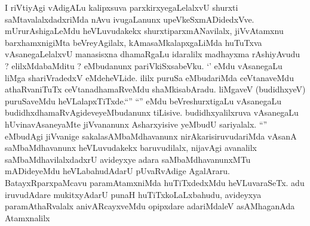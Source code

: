 \begin{artha}
I riVtiyAgi vAdigALu kalipxsuva parxkirxyegaLelalxvU shurxti
saMtavalalxdadxriMda nAvu ivugaLanunx
upeVkeSxmADidedxVve. mUrurAshigaLeMdu heVLuvudakekx
shurxtiparxmANavilalx, jiVvAtamxnu barxhamxnigiMta beVreyAgilalx,
kAmasaMkalapxgaLiMda huTuTxva vAsanegaLelalxvU manasisxna dhamaRgaLu
idaralilx madhayxma rAshiyAvudu ? elilxMdabaMditu ? eMbudanunx
pariVkiSxsabeVku. `\stext' eMdu vAsanegaLu liMga shariVradedxV
eMdeheVLide. ililx puruSa eMbudariMda ceVtanaveMdu athaRvaniTuTx
ceVtanadhamaRveMdu shaMkisabAradu. liMgaveV (budidhxyeV) puruSaveMdu
heVLalapxTiTxde.``\stext'' ``\stext'' eMdu  beVreshurxtigaLu
vAsanegaLu budidhxdhamaRvAgideveyeMbudanunx
tiLisive. budidhxyalilxruva vAsanegaLu hUvinavAsaneyaMte jiVvananunx
Asharxyisive yeMbudU sariyalalx. ``\stext'' eMbudAgi jiVvanige
sakalasAMbaMdhavanunx nirAkarisiruvudariMda vAsanA saMbaMdhavanunx
heVLuvudakekx baruvudilalx, nijavAgi avanalilx saMbaMdhavilalxdadxrU
avideyxye adara saMbaMdhavanunxMTu mADideyeMdu heVLabahudAdarU
pUvaRvAdige AgalAraru. BatayxRparxpaMcavu paramAtamxniMda
huTiTxdedxMdu heVLuvaraSeTx. adu iruvudAdare mukitxyAdarU punaH
huTiTxkoLaLxbahudu, avideyxya paramAthaRvalalx anivARcayxveMdu
opipxdare adariMdaleV asAMhaganAda Atamxnalilx%
\end{artha}
